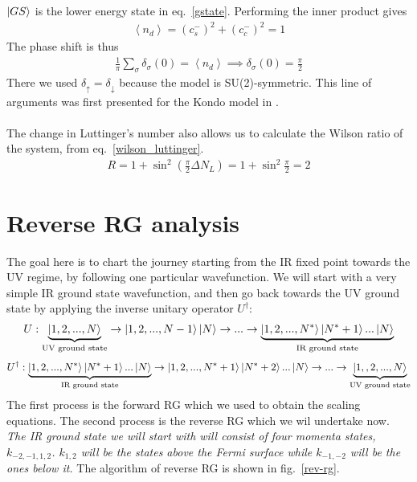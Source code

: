 \documentclass[twoside,11pt]{report}
\numberwithin{equation}{section}
\begin{document}
\(\ket{GS}\) is the lower energy state in eq.~\ref{gstate}. Performing the inner product gives
\begin{equation}\begin{aligned}
	\left<n_d \right> = \left( c_s^- \right)^2 + \left( c_c^- \right)^2 = 1
\end{aligned}\end{equation}
The phase shift is thus
\begin{equation}\begin{aligned}
	\frac{1}{\pi}\sum_\sigma \delta_\sigma(0) = \left<n_d \right> \implies \delta_\sigma(0) = \frac{\pi}{2}
\end{aligned}\end{equation}
There we used \(\delta_\uparrow = \delta_\downarrow\) because the model is SU(2)-symmetric. This line of arguments was first presented for the Kondo model in \cite{martin}.
\\\\The change in Luttinger's number also allows us to calculate the Wilson ratio of the system, from eq.~\ref{wilson_luttinger}.
\begin{equation}\begin{aligned}
	R = 1 + \sin^2 \left( \frac{\pi}{2}\Delta N_L \right) = 1 + \sin^2 \frac{\pi}{2} = 2
\end{aligned}\end{equation}
\section{Reverse RG analysis}\label{rev_rg}
The goal here is to chart the journey starting from the IR fixed point towards the UV regime, by following one particular wavefunction. We will start with a very simple IR ground state wavefunction, and then go back towards the UV ground state by applying the inverse unitary operator \(U^\dagger\):
\begin{equation*}\begin{aligned}
	U : \underbrace{\ket{1,2,...,N}}_\text{UV ground state} \rightarrow \ket{1,2,...,N-1}\ket{N} \rightarrow ... \rightarrow \underbrace{\ket{1,2,...,N^*}\ket{N^*+1}...\ket{N}}_\text{IR ground state}
\end{aligned}\end{equation*}
\begin{equation*}\begin{aligned}
	U^\dagger : \underbrace{\ket{1,2,...,N^*}\ket{N^*+1}...\ket{N}}_\text{IR ground state} \rightarrow \ket{1,2,...,N^*+1}\ket{N^*+2}...\ket{N} \rightarrow ... \rightarrow\underbrace{\ket{1,,2,...,N}}_\text{UV ground state}
\end{aligned}\end{equation*}
The first process is the forward RG which we used to obtain the scaling equations. The second process is the reverse RG which we wil undertake now. \textit{The IR ground state we will start with will consist of four momenta states, \(k_{-2, -1, 1 ,2}\). \(k_{1,2}\) will be the states above the Fermi surface while \(k_{-1, -2}\) will be the ones below it.} The algorithm of reverse RG is shown in fig.~\ref{rev-rg}.
\end{document}
